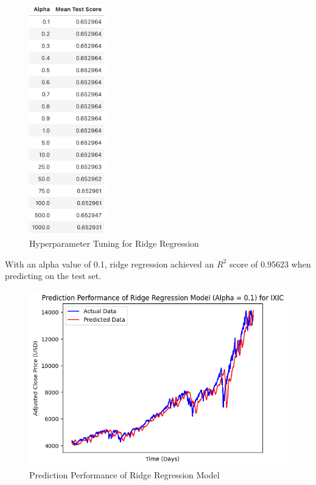 \documentclass[a4paper, 11pt]{article}
\begin{document}
\begin{figure}[H]
    \begin{center}
        \includegraphics[width=0.3\textwidth]{Hyperparameter Tuning for Ridge Regression.png}
        \caption{Hyperparameter Tuning for Ridge Regression}
    \end{center}
\end{figure}

With an alpha value of 0.1, ridge regression achieved an $R^2$ score of 0.95623 when predicting on the test set.

\begin{figure}[H]
    \begin{center}
        \includegraphics[width=1\textwidth]{Prediction Performance of Ridge Regression Model.png}
        \caption{Prediction Performance of Ridge Regression Model}
    \end{center}
\end{figure}
\end{document}
